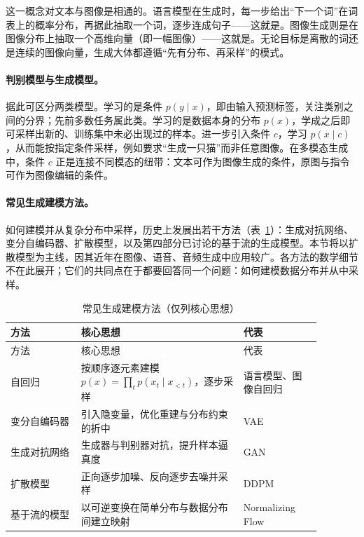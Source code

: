 这一概念对文本与图像是相通的。语言模型在生成时，每一步给出“下一个词”在词表上的概率分布，再据此抽取一个词，逐步连成句子——这就是。图像生成则是在图像分布上抽取一个高维向量（即一幅图像）——这就是。无论目标是离散的词还是连续的图像向量，生成大体都遵循“先有分布、再采样”的模式。

\paragraph{判别模型与生成模型。}据此可区分两类模型。学习的是条件 $p(y\mid x)$，即由输入预测标签，关注类别之间的分界；先前多数任务属此类。学习的是数据本身的分布 $p(x)$，学成之后即可采样出新的、训练集中未必出现过的样本。进一步引入条件 $c$，学习 $p(x\mid c)$，从而能按指定条件采样，例如要求“生成一只猫”而非任意图像。在多模态生成中，条件 $c$ 正是连接不同模态的纽带：文本可作为图像生成的条件，原图与指令可作为图像编辑的条件。

\paragraph{常见生成建模方法。}如何建模并从复杂分布中采样，历史上发展出若干方法（表~\ref{tab:genfamily}）：生成对抗网络\cite{gan}、变分自编码器\cite{vae}、扩散模型\cite{ddpm}，以及第四部分已讨论的基于流的生成模型。本节将以扩散模型为主线，因其近年在图像、语音、音频生成中应用较广。各方法的数学细节不在此展开；它们的共同点在于都要回答同一个问题：如何建模数据分布并从中采样。

\begin{longtable}{p{0.20\linewidth}p{0.46\linewidth}p{0.22\linewidth}}
  \caption{常见生成建模方法（仅列核心思想）}\label{tab:genfamily}\\
  \toprule
  方法 & 核心思想 & 代表 \\
  \midrule
  \endfirsthead
  \toprule
  方法 & 核心思想 & 代表 \\
  \midrule
  \endhead
  自回归 & 按顺序逐元素建模 $p(x)=\prod_t p(x_t\mid x_{<t})$，逐步采样 & 语言模型、图像自回归 \\
  变分自编码器 & 引入隐变量，优化重建与分布约束的折中 & VAE \\
  生成对抗网络 & 生成器与判别器对抗，提升样本逼真度 & GAN \\
  扩散模型 & 正向逐步加噪、反向逐步去噪并采样 & DDPM \\
  基于流的模型 & 以可逆变换在简单分布与数据分布间建立映射 & Normalizing Flow \\
  \bottomrule
\end{longtable}

